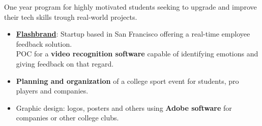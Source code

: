 \documentclass[9pt,a4paper,ragged2e]{altacv}
\begin{document}
One year program for highly motivated students seeking to upgrade and improve their tech skills trough real-world projects.
\smallskip
\begin{itemize}
	\item \href{https://flashbrand.me/}{\textbf{Flashbrand}}: Startup based in San Francisco offering a real-time employee feedback solution. \\POC for a \textbf{video recognition software} capable of identifying emotions and giving feedback on that regard.
\end{itemize}
\divider
{}
\begin{itemize}
	\item \textbf{Planning and organization} of a college sport event for students, pro players and companies.
\end{itemize}
\divider
{}
\begin{itemize}
	\item Graphic design: logos, posters and others using \textbf{Adobe software} for companies or other college clubs.
\end{itemize}



\end{document}
